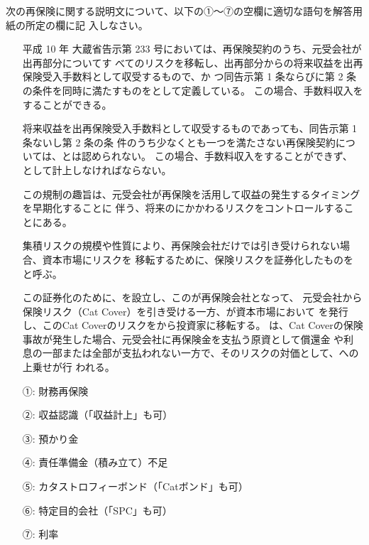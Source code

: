 \documentclass[report,gutter=10mm,fore-edge=10mm,uplatex,dvipdfmx]{jlreq}
\begin{document}
次の再保険に関する説明文について、以下の①～⑦の空欄に適切な語句を解答用紙の所定の欄に記
入しなさい。

\begin{itemize}
\item[] 平成 10 年 大蔵省告示第 233 号においては、再保険契約のうち、元受会社が出再部分についてす
 べてのリスクを移転し、出再部分からの将来収益を出再保険受入手数料として収受するもので、か
 つ同告示第 1 条ならびに第 2 条の条件を同時に満たすものをとして定義している。
 この場合、手数料収入をすることができる。

\item[] 将来収益を出再保険受入手数料として収受するものであっても、同告示第 1 条ないし第 2 条の条
 件のうち少なくとも一つを満たさない再保険契約については、とは認められない。
 この場合、手数料収入をすることができず、
 として計上しなければならない。

\item[] この規制の趣旨は、元受会社が再保険を活用して収益の発生するタイミングを早期化することに
 伴う、将来のにかかわるリスクをコントロールすることにある。

\item[] 集積リスクの規模や性質により、再保険会社だけでは引き受けられない場合、資本市場にリスクを
 移転するために、保険リスクを証券化したものをと呼ぶ。

\item[] この証券化のために、を設立し、このが再保険会社となって、
 元受会社から保険リスク（Cat Cover）を引き受ける一方、が資本市場において
 を発行し、このCat Coverのリスクをから投資家に移転する。
 は、Cat Coverの保険事故が発生した場合、元受会社に再保険金を支払う原資として償還金
 や利息の一部または全部が支払われない一方で、そのリスクの対価として、への上乗せが行
 われる。
\end{itemize}

\answer{}
\begin{itemize}
\item[ ①: ] 財務再保険
\item[ ②: ] 収益認識（「収益計上」も可）
\item[ ③: ] 預かり金
\item[ ④: ] 責任準備金（積み立て）不足
\item[ ⑤: ] カタストロフィーボンド（「Catボンド」も可）
\item[ ⑥: ] 特定目的会社（「SPC」も可）
\item[ ⑦: ] 利率
\end{itemize}
\end{document}
